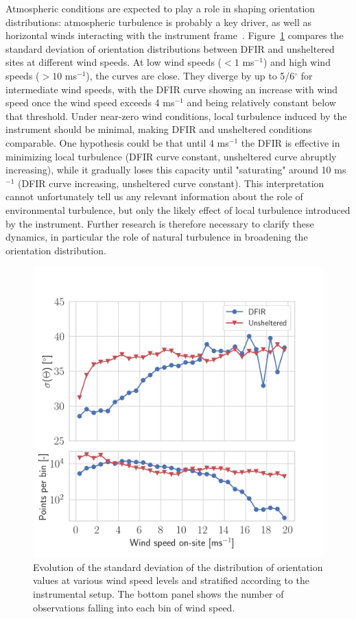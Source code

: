 \documentclass[draft]{agujournal2019}
\begin{document}
Atmospheric conditions are expected to play a role in shaping orientation distributions: atmospheric turbulence is probably a key driver, as well as horizontal winds interacting with the instrument frame~\cite{Fitch_AMT_2021}. Figure~\ref{fig:wind-effect} compares the standard deviation of orientation distributions between DFIR and unsheltered sites at different wind speeds. At low wind speeds ($<1$ ms$^{-1}$) and high wind speeds ($>10$ ms$^{-1}$), the curves are close. They diverge by up to 5/6$^\circ$ for intermediate wind speeds, with the DFIR curve showing an increase with wind speed once the wind speed exceeds 4 ms$^{-1}$ and being relatively constant below that threshold. Under near-zero wind conditions, local turbulence induced by the instrument  should be minimal, making DFIR and unsheltered conditions comparable. One hypothesis could be that until 4 ms$^{-1}$ the DFIR is effective in minimizing local turbulence (DFIR curve constant, unsheltered curve abruptly increasing), while it gradually loses this capacity until "saturating" around 10 ms$^{-1}$ (DFIR curve increasing, unsheltered curve constant). This interpretation cannot unfortunately tell us any relevant information about the role of environmental turbulence, but only the likely effect of local turbulence introduced by the instrument.  Further research is therefore necessary to clarify these dynamics, in particular the role of natural turbulence in broadening the orientation distribution.

\begin{figure}
 \noindent \centering \includegraphics[width=\textwidth]{Fig04.png}
\caption{Evolution of the standard deviation of the  distribution of orientation values at various wind speed levels and stratified according to the instrumental setup. The bottom panel shows the number of observations falling into each bin of wind speed.  }
\label{fig:wind-effect}
\end{figure}
\end{document}
